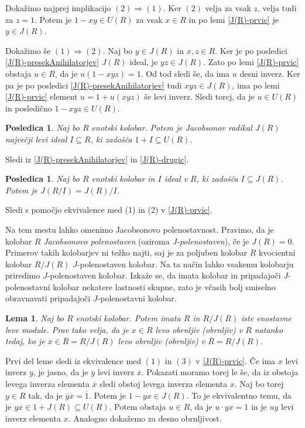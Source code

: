 \documentclass[a4paper, 12pt]{amsart}
\theoremstyle{definition} %
\theoremstyle{plain} %
\newtheorem{lema}[definicija]{Lema}
\newtheorem{posledica}[definicija]{Posledica}
\begin{document}
\proof
Dokažimo najprej implikacijo $(2) \Rightarrow (1)$. Ker $(2)$ velja za vsak $z$, velja tudi za $z=1$. Potem je $1- xy\in U(R)$ za vsak $x\in R$ in po lemi  \ref{J(R)-prvic} je $y\in J(R)$. 

Dokažimo še $(1) \Rightarrow (2)$. Naj bo $y\in J(R)$ in $x,z\in R$. Ker je po posledici \ref{J(R)-presekAnihilatorjev} $J(R)$ ideal, je $yz\in J(R)$. Zato po lemi \ref{J(R)-prvic} obstaja $u\in R$, da je $u (1-xyz) = 1$. Od tod sledi še, da ima $u$ desni inverz. Ker pa je po posledici \ref{J(R)-presekAnihilatorjev} tudi $xyz\in J(R)$, ima po lemi \ref{J(R)-prvic} element  $u = 1+ u(xyz)$ še levi inverz. Sledi torej, da je $u\in U(R)$ in posledično $1-xyz\in U(R)$.
\endproof

\begin{posledica}
\label{1+J(R)podU(R)}
Naj bo $R$ enotski kolobar. Potem je Jacobsonov radikal $J(R)$ največji levi ideal $I \subseteq R$, ki zadošča $1+I\subseteq U(R)$.
\end{posledica}

\proof
Sledi iz \ref{J(R)-presekAnihilatorjev} in \ref{J(R)-drugic}.
\endproof

\begin{posledica}
Naj bo $R$ enotski kolobar in $I$ ideal v $R$, ki zadošča $I\subseteq J(R)$. Potem je $J(R/I) = J(R)/I$.
\end{posledica}

\proof
Sledi s pomočjo ekvivalence med (1) in (2) v \ref{J(R)-prvic}.
\endproof

Na tem mestu lahko omenimo Jacobsonovo polenostavnost. Pravimo, da je kolobar $R$ \emph{Jacobsonovo polenostaven} (oziroma \emph{J-polenostaven}), če je $J(R) = 0$. Primerov takih kolobarjev ni težko najti, saj je za poljuben kolobar $R$ kvocientni kolobar $R/J(R)$ $J$-polenostaven kolobar. Na ta način lahko vsakemu kolobarju priredimo $J$-polenostaven kolobar. Izkaže se, da imata kolobar in pripadajoči $J$-polenostavni kolobar nekatere lastnosti skupne, zato je včasih bolj smiselno obravnavati pripadajoči $J$-polenostavni kolobar.

\begin{lema}
\label{RinR/J(R)}
Naj bo $R$ enotski kolobar. Potem imata $R$ in $R/J(R)$ iste enostavne leve module. Prav tako velja, da je $x\in R$ levo obrnljiv (obrnljiv) v $R$ natanko tedaj, ko je $\overline{x} \in \overline{R} = R/J(R)$ levo obrnljiv (obrnljiv) v $\overline{R} = R/J(R)$.
\end{lema}

\proof
Prvi del leme sledi iz ekvivalence med $(1)$ in $(3)$ v \ref{J(R)-prvic}. Če ima $x$ levi inverz $y$, je jasno, da je $\overline{y}$ levi inverz $\overline{x}$. Pokazati moramo torej le še, da iz obstoja levega inverza elementa $\overline{x}$ sledi obstoj levega inverza  elementa $x$. Naj bo torej $y\in R$ tak, da je $\overline{y} \overline{x} = \overline{1}$. Potem je $1- yx \in J(R)$. To je ekvivalentno temu, da je $yx \in 1 + J(R) \subseteq U(R)$. Potem obstaja  $u\in R$, da je $u\cdot yx =1$ in je $uy $ levi inverz elementa $x$. Analogno dokažemo za desno obrnljivost.
\endproof
\end{document}
